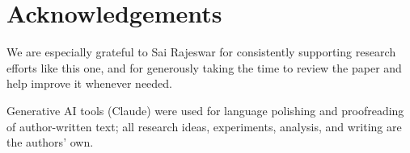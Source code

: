 \section*{Acknowledgements}

We are especially grateful to Sai Rajeswar for consistently supporting research efforts like this one, and for generously taking the time to review the paper and help improve it whenever needed.

Generative AI tools (Claude) were used for language polishing and proofreading of author-written text; all research ideas, experiments, analysis, and writing are the authors' own.
